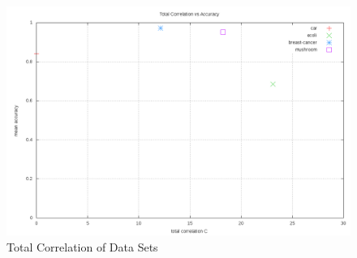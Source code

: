\documentclass[10pt]{report}
\begin{document}
\begin{figure}
  \begin{center}
	\includegraphics[width=\textwidth,height=!]{correlation}
  \end{center}
  \caption{Total Correlation of Data Sets}
  \label{fig:correlation}
\end{figure} 

\renewcommand{\bibname}{References}



\end{document}

